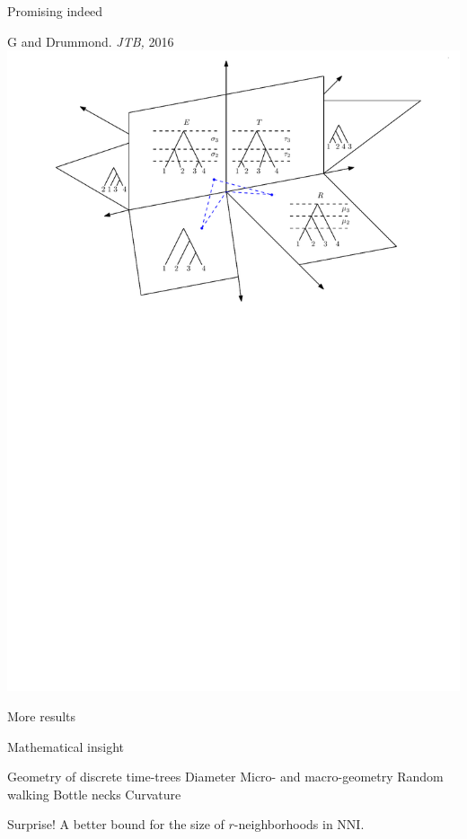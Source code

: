 \documentclass{beamer}
\newcommand{\nni}{\mathrm{NNI}}
\theoremstyle{example}
\begin{document}
\begin{frame}{Promising indeed}
\begin{block}{G and Drummond. \emph{JTB,} 2016}
\includegraphics[width=\framewidth]{tauSpace}
\end{block}
\end{frame}

\begin{frame}{More results}
\begin{block}{Mathematical insight}
\begin{outline}
\1 Geometry of discrete time-trees
	\2 Diameter
	\2 Micro- and macro-geometry
\1 Random walking
	\2 Bottle necks
	\2 Curvature
\end{outline}
\end{block}

\pause

\begin{block}{Surprise!}
A better bound for the size of $r$-neighborhoods in $\nni$.
\end{block}
\end{frame}
\end{document}
